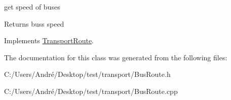 get speed of buses 

\begin{DoxyReturn}{Returns}
buss speed 
\end{DoxyReturn}


Implements \hyperlink{class_transport_route_a76a8834e9595e973f61f3376ff3d9d34}{Transport\+Route}.



The documentation for this class was generated from the following files\+:\begin{DoxyCompactItemize}
\item 
C\+:/\+Users/\+André/\+Desktop/test/transport/Bus\+Route.\+h\item 
C\+:/\+Users/\+André/\+Desktop/test/transport/Bus\+Route.\+cpp\end{DoxyCompactItemize}

